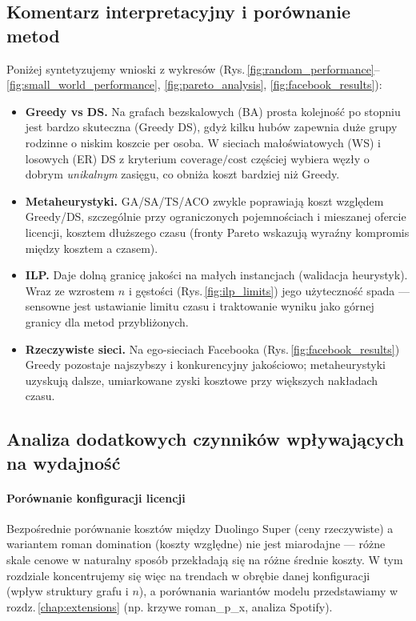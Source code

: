 \subsection{Komentarz interpretacyjny i porównanie metod}
\label{subsec:interpretation}
Poniżej syntetyzujemy wnioski z wykresów (Rys.\,\ref{fig:random_performance}--\ref{fig:small_world_performance}, \ref{fig:pareto_analysis}, \ref{fig:facebook_results}):
\begin{itemize}
  \item \textbf{Greedy vs DS.} Na grafach bezskalowych (BA) prosta kolejność po stopniu jest bardzo skuteczna (Greedy \approx DS), gdyż kilku hubów zapewnia duże grupy rodzinne o niskim koszcie per osoba. W sieciach małoświatowych (WS) i losowych (ER) DS z kryterium \(\mathrm{coverage}/\mathrm{cost}\) częściej wybiera węzły o dobrym \emph{unikalnym} zasięgu, co obniża koszt bardziej niż Greedy.
  \item \textbf{Metaheurystyki.} GA/SA/TS/ACO zwykle poprawiają koszt względem Greedy/DS, szczególnie przy ograniczonych pojemnościach i mieszanej ofercie licencji, kosztem dłuższego czasu (fronty Pareto wskazują wyraźny kompromis między kosztem a czasem).
  \item \textbf{ILP.} Daje dolną granicę jakości na małych instancjach (walidacja heurystyk). Wraz ze wzrostem \(n\) i gęstości (Rys.\,\ref{fig:ilp_limits}) jego użyteczność spada — sensowne jest ustawianie limitu czasu i traktowanie wyniku jako górnej granicy dla metod przybliżonych.
  \item \textbf{Rzeczywiste sieci.} Na ego-sieciach Facebooka (Rys.\,\ref{fig:facebook_results}) Greedy pozostaje najszybszy i konkurencyjny jakościowo; metaheurystyki uzyskują dalsze, umiarkowane zyski kosztowe przy większych nakładach czasu.
\end{itemize}

\subsection{Analiza dodatkowych czynników wpływających na wydajność}

\paragraph{Porównanie konfiguracji licencji}
Bezpośrednie porównanie kosztów między Duolingo Super (ceny rzeczywiste) a wariantem roman domination (koszty względne) nie jest miarodajne — różne skale cenowe w naturalny sposób przekładają się na różne średnie koszty. W tym rozdziale koncentrujemy się więc na trendach w obrębie danej konfiguracji (wpływ struktury grafu i \(n\)), a porównania wariantów modelu przedstawiamy w rozdz.\,\ref{chap:extensions} (np. krzywe roman\_p\_x, analiza Spotify).

